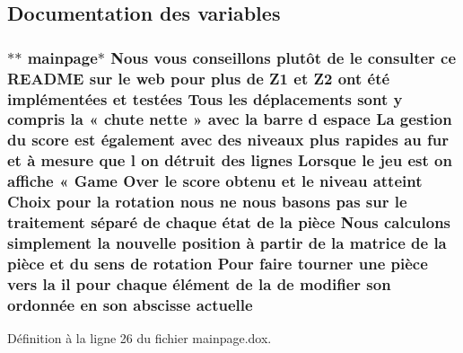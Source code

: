 \subsection{Documentation des variables}
\hypertarget{mainpage_8dox_a0f00ab298800bde58e9f4aa9060803e5}{
\subsubsection[{actuelle}]{\setlength{\rightskip}{0pt plus 5cm}$\ast$$\ast$ mainpage$\ast$ Nous vous conseillons plutô{\bf t} {\bf de} le consulter ce R\-E\-A\-D\-M\-E sur le web pour plus {\bf de} {\bf Z1} et Z2 ont é{\bf t}é implémentées et testées Tous les déplacements sont {\bf y} compris la « chute nette » avec la barre d espace La gestion du score est également avec des niveaux plus rapides au fur et à mesure que l on détruit des lignes Lorsque le jeu est on affiche « Game Over le score obtenu et le niveau atteint Choix pour la rotation nous ne nous basons pas sur le traitement {\bf s}éparé {\bf de} chaque état {\bf de} la pièce Nous calculons simplement la nouvelle position à partir {\bf de} la {\bf matrice} {\bf de} la pièce et du {\bf sens} {\bf de} rotation Pour faire tourner une pièce vers la il pour chaque élément {\bf de} la {\bf de} modifier son ordonnée en son abscisse actuelle}}\label{mainpage_8dox_a0f00ab298800bde58e9f4aa9060803e5}


Définition à la ligne 26 du fichier mainpage.\-dox.


